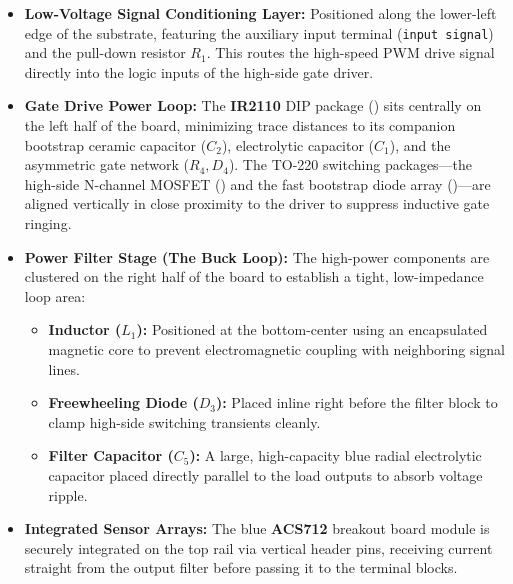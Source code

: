 \documentclass[12pt,a4paper]{article}
\begin{document}
\begin{itemize}
    \item \textbf{Low-Voltage Signal Conditioning Layer:} Positioned along the lower-left edge of the substrate, featuring the auxiliary input terminal (\texttt{input signal}) and the pull-down resistor $R_1$. This routes the high-speed PWM drive signal directly into the logic inputs of the high-side gate driver.
    \item \textbf{Gate Drive Power Loop:} The \textbf{IR2110} DIP package () sits centrally on the left half of the board, minimizing trace distances to its companion bootstrap ceramic capacitor ($C_2$), electrolytic capacitor ($C_1$), and the asymmetric gate network ($R_4, D_4$). The TO-220 switching packages—the high-side N-channel MOSFET () and the fast bootstrap diode array ()—are aligned vertically in close proximity to the driver to suppress inductive gate ringing.
    \item \textbf{Power Filter Stage (The Buck Loop):} The high-power components are clustered on the right half of the board to establish a tight, low-impedance loop area:
    \begin{itemize}
        \item \textbf{Inductor ($L_1$):} Positioned at the bottom-center using an encapsulated magnetic core to prevent electromagnetic coupling with neighboring signal lines.
        \item \textbf{Freewheeling Diode ($D_3$):} Placed inline right before the filter block to clamp high-side switching transients cleanly.
        \item \textbf{Filter Capacitor ($C_5$):} A large, high-capacity blue radial electrolytic capacitor placed directly parallel to the load outputs to absorb voltage ripple.
    \end{itemize}
    \item \textbf{Integrated Sensor Arrays:} The blue \textbf{ACS712} breakout board module is securely integrated on the top rail via vertical header pins, receiving current straight from the output filter before passing it to the terminal blocks. 
\end{itemize}
\end{document}
